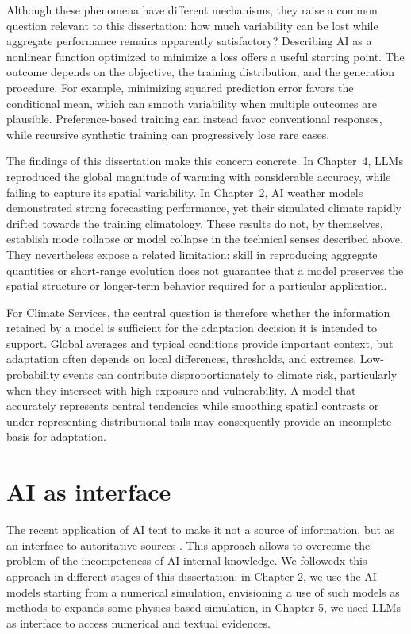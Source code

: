 Although these phenomena have different mechanisms, they raise a common question relevant to this dissertation: how much variability can be lost while aggregate performance remains apparently satisfactory? Describing AI as a nonlinear function optimized to minimize a loss offers a useful starting point. The outcome depends on the objective, the training distribution, and the generation procedure. For example, minimizing squared prediction error favors the conditional mean, which can smooth variability when multiple outcomes are plausible. Preference-based training can instead favor conventional responses, while recursive synthetic training can progressively lose rare cases. 

The findings of this dissertation make this concern concrete. In Chapter~4, LLMs reproduced the global magnitude of warming with considerable accuracy, while failing to capture its spatial variability. In Chapter~2, AI weather models demonstrated strong forecasting performance, yet their simulated climate rapidly drifted towards the training climatology. These results do not, by themselves, establish mode collapse or model collapse in the technical senses described above. They nevertheless expose a related limitation: skill in reproducing aggregate quantities or short-range evolution does not guarantee that a model preserves the spatial structure or longer-term behavior required for a particular application.

For Climate Services, the central question is therefore whether the information retained by a model is sufficient for the adaptation decision it is intended to support. Global averages and typical conditions provide important context, but adaptation often depends on local differences, thresholds, and extremes. Low-probability events can contribute disproportionately to climate risk, particularly when they intersect with high exposure and vulnerability. A model that accurately represents central tendencies while smoothing spatial contrasts or under representing distributional tails may consequently provide an incomplete basis for adaptation.

\section{AI as interface}

The recent application of AI tent to make it not a source of information, but as an interface to autoritative sources \citep{mialon_augmented_2023}. This approach allows to overcome the problem of the incompeteness of AI internal knowledge. We followedx this approach in different stages of this dissertation: in Chapter 2, we use the AI models starting from a numerical simulation, envisioning a use of such models as methods to expands some physics-based simulation, in Chapter 5, we used LLMs as interface to access numerical and textual evidences. 

